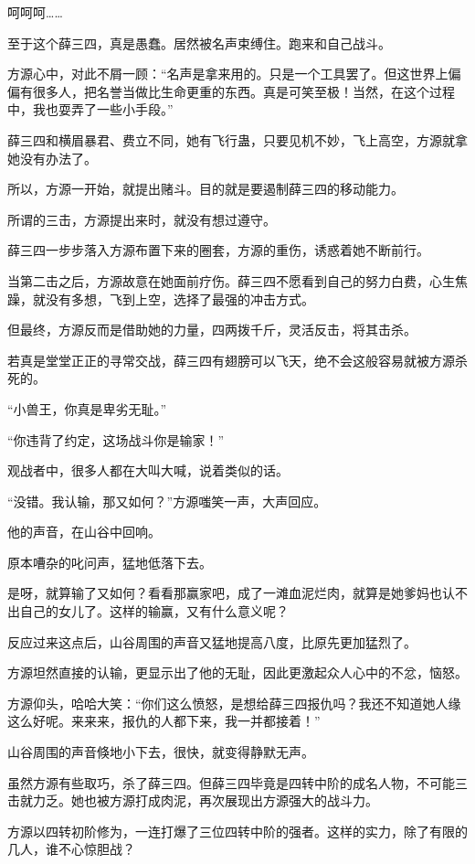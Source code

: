 \begin{this_body}
呵呵呵……

至于这个薛三四，真是愚蠢。居然被名声束缚住。跑来和自己战斗。

方源心中，对此不屑一顾：“名声是拿来用的。只是一个工具罢了。但这世界上偏偏有很多人，把名誉当做比生命更重的东西。真是可笑至极！当然，在这个过程中，我也耍弄了一些小手段。”

薛三四和横眉暴君、费立不同，她有飞行蛊，只要见机不妙，飞上高空，方源就拿她没有办法了。

所以，方源一开始，就提出赌斗。目的就是要遏制薛三四的移动能力。

所谓的三击，方源提出来时，就没有想过遵守。

薛三四一步步落入方源布置下来的圈套，方源的重伤，诱惑着她不断前行。

当第二击之后，方源故意在她面前疗伤。薛三四不愿看到自己的努力白费，心生焦躁，就没有多想，飞到上空，选择了最强的冲击方式。

但最终，方源反而是借助她的力量，四两拨千斤，灵活反击，将其击杀。

若真是堂堂正正的寻常交战，薛三四有翅膀可以飞天，绝不会这般容易就被方源杀死的。

“小兽王，你真是卑劣无耻。”

“你违背了约定，这场战斗你是输家！”

观战者中，很多人都在大叫大喊，说着类似的话。

“没错。我认输，那又如何？”方源嗤笑一声，大声回应。

他的声音，在山谷中回响。

原本嘈杂的叱问声，猛地低落下去。

是呀，就算输了又如何？看看那赢家吧，成了一滩血泥烂肉，就算是她爹妈也认不出自己的女儿了。这样的输赢，又有什么意义呢？

反应过来这点后，山谷周围的声音又猛地提高八度，比原先更加猛烈了。

方源坦然直接的认输，更显示出了他的无耻，因此更激起众人心中的不忿，恼怒。

方源仰头，哈哈大笑：“你们这么愤怒，是想给薛三四报仇吗？我还不知道她人缘这么好呢。来来来，报仇的人都下来，我一并都接着！”

山谷周围的声音倏地小下去，很快，就变得静默无声。

虽然方源有些取巧，杀了薛三四。但薛三四毕竟是四转中阶的成名人物，不可能三击就力乏。她也被方源打成肉泥，再次展现出方源强大的战斗力。

方源以四转初阶修为，一连打爆了三位四转中阶的强者。这样的实力，除了有限的几人，谁不心惊胆战？


\end{this_body}
